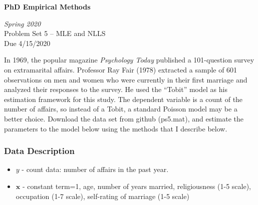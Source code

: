 \documentclass[10pt]{article}
\newcommand{\bs}{\boldsymbol}
\begin{document}
\begin{center}
\textbf{PhD Empirical Methods}

\emph{Spring 2020}\\[1em]

Problem Set 5 -- MLE and NLLS \\
Due 4/15/2020\\[3em]
\end{center}












In 1969, the popular magazine \emph{Psychology Today} published a 101-question survey on extramarital affairs. Professor Ray Fair (1978) extracted a sample of 601 observations on men and women who were currently in their first marriage and analyzed their responses to the survey. He used the ``Tobit'' model as his estimation framework for this study. The dependent variable is a count of the number of affairs, so instead of a Tobit, a standard Poisson model may be a better choice. Download the data set from github (ps5.mat), and estimate the parameters to the model below using the methods that I describe below. 

\subsubsection*{Data Description} %
 \label{ssub:data_description}

 \begin{itemize}
 	\item $y$ - count data: number of affairs in the past year.
 	\item $\bs{x}$ - constant term=1, age, number of years married, religiousness (1-5 scale), occupation (1-7 scale), self-rating of marriage (1-5 scale)
 \end{itemize}
\end{document}
